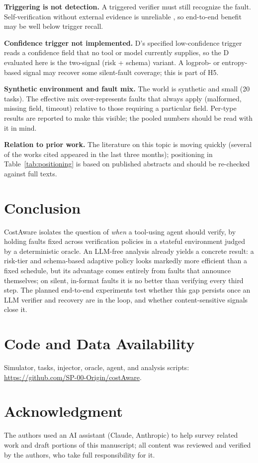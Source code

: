 \documentclass[conference]{IEEEtran}
\begin{document}
\textbf{Triggering is not detection.} A triggered verifier must still recognize the fault.
Self-verification without external evidence is unreliable \cite{huang2024cannot}, so end-to-end
benefit may be well below trigger recall.

\textbf{Confidence trigger not implemented.} D's specified low-confidence trigger reads a
confidence field that no tool or model currently supplies, so the D evaluated here is the
two-signal (risk + schema) variant. A logprob- or entropy-based signal \cite{park2026sag} may
recover some silent-fault coverage; this is part of H5.

\textbf{Synthetic environment and fault mix.} The world is synthetic and small (20 tasks). The
effective mix over-represents faults that always apply (malformed, missing field, timeout)
relative to those requiring a particular field. Per-type results are reported to make this
visible; the pooled numbers should be read with it in mind.

\textbf{Relation to prior work.} The literature on this topic is moving quickly (several of the
works cited appeared in the last three months); positioning in Table~\ref{tab:positioning} is
based on published abstracts and should be re-checked against full texts.

\section{Conclusion}
CostAware isolates the question of \emph{when} a tool-using agent should verify, by holding
faults fixed across verification policies in a stateful environment judged by a deterministic
oracle. An LLM-free analysis already yields a concrete result: a risk-tier and schema-based
adaptive policy looks markedly more efficient than a fixed schedule, but its advantage comes
entirely from faults that announce themselves; on silent, in-format faults it is no better
than verifying every third step. The planned end-to-end experiments test whether this gap
persists once an LLM verifier and recovery are in the loop, and whether content-sensitive
signals close it.

\section*{Code and Data Availability}
Simulator, tasks, injector, oracle, agent, and analysis scripts:
\url{https://github.com/SP-00-Origin/costAware}.

\section*{Acknowledgment}
The authors used an AI assistant (Claude, Anthropic) to help survey related work and draft
portions of this manuscript; all content was reviewed and verified by the authors, who take
full responsibility for it.



\end{document}
